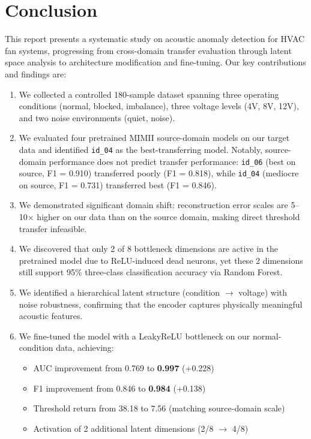 \documentclass[12pt, a4paper]{article}
\begin{document}
\section{Conclusion}
\label{sec:conclusion}

This report presents a systematic study on acoustic anomaly detection for HVAC fan systems, progressing from cross-domain transfer evaluation through latent space analysis to architecture modification and fine-tuning. Our key contributions and findings are:

\begin{enumerate}
    \item We collected a controlled 180-sample dataset spanning three operating conditions (normal, blocked, imbalance), three voltage levels (4V, 8V, 12V), and two noise environments (quiet, noise).

    \item We evaluated four pretrained MIMII source-domain models on our target data and identified \texttt{id\_04} as the best-transferring model. Notably, source-domain performance does not predict transfer performance: \texttt{id\_06} (best on source, F1 = 0.910) transferred poorly (F1 = 0.818), while \texttt{id\_04} (mediocre on source, F1 = 0.731) transferred best (F1 = 0.846).

    \item We demonstrated significant domain shift: reconstruction error scales are 5--10$\times$ higher on our data than on the source domain, making direct threshold transfer infeasible.

    \item We discovered that only 2 of 8 bottleneck dimensions are active in the pretrained model due to ReLU-induced dead neurons, yet these 2 dimensions still support 95\% three-class classification accuracy via Random Forest.

    \item We identified a hierarchical latent structure (condition $\rightarrow$ voltage) with noise robustness, confirming that the encoder captures physically meaningful acoustic features.

    \item We fine-tuned the model with a LeakyReLU bottleneck on our normal-condition data, achieving:
    \begin{itemize}
        \item AUC improvement from 0.769 to \textbf{0.997} (+0.228)
        \item F1 improvement from 0.846 to \textbf{0.984} (+0.138)
        \item Threshold return from 38.18 to 7.56 (matching source-domain scale)
        \item Activation of 2 additional latent dimensions (2/8 $\rightarrow$ 4/8)
    \end{itemize}


\end{enumerate}
\end{document}

